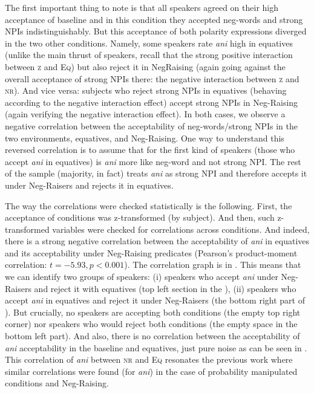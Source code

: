 The first important thing to note is that all speakers agreed on their high acceptance of baseline and in this condition they accepted neg-words and strong NPIs indistinguishably. But this acceptance of both polarity expressions diverged in the two other conditions. Namely, some speakers rate \textit{ani} high in equatives (unlike the main thrust of speakers, recall that the strong positive interaction between \textsc{z} and \textsc{Eq}) but also reject it in NegRaising (again going against the overall acceptance of strong NPIs there: the negative interaction between \textsc{z} and \textsc{nr}). And vice versa: subjects who reject strong NPIs in equatives (behaving according to the negative interaction effect) accept strong NPIs in Neg-Raising (again verifying the negative interaction effect). In both cases, we observe a negative correlation between the acceptability of neg-words/strong NPIs in the two environments, equatives, and Neg-Raising. One way to understand this reversed correlation is to assume that for the first kind of speakers (those who accept \textit{ani} in equatives) is \textit{ani} more like neg-word and not strong NPI. The rest of the sample (majority, in fact) treats \textit{ani} as strong NPI and therefore accepts it under Neg-Raisers and rejects it in equatives.

The way the correlations were checked statistically is the following. First, the acceptance of conditions was z-transformed (by subject). And then, such z-transformed variables were checked for correlations across conditions. And indeed, there is a strong negative correlation between the acceptability of \textit{ani} in equatives and its acceptability under Neg-Raising predicates (Pearson's product-moment correlation: $t = -5.93, p < 0.001$). The correlation graph is in . This means that we can identify two groups of speakers: (i) speakers who accept \textit{ani} under Neg-Raisers and reject it with equatives (top left section in the ), (ii) speakers who accept \textit{ani} in equatives and reject it under Neg-Raisers (the bottom right part of ). But crucially, no speakers are accepting both conditions (the empty top right corner) nor speakers who would reject both conditions (the empty space in the bottom left part). And also, there is no correlation between the acceptability of \textit{ani} acceptability in the baseline and equatives, just pure noise as can be seen in . This correlation of \textit{ani} between \textsc{nr} and \textsc{Eq} resonates the previous work \cite{docekaldotlacilsubber} where similar correlations were found (for \textit{ani}) in the case of probability manipulated conditions and Neg-Raising.

